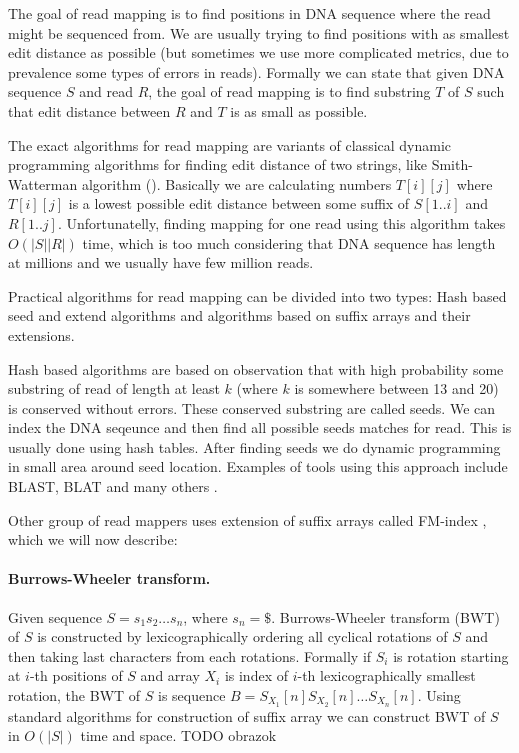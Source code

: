 The goal of read mapping is to find positions in DNA sequence where the read might be sequenced
from. We are usually trying to find positions with as smallest edit distance as possible
(but sometimes we use more complicated metrics, due to prevalence some types of errors in reads).
Formally we can state that given DNA sequence $S$ and read $R$, the goal of read mapping
is to find substring $T$ of $S$ such that edit distance between $R$ and $T$ is as small as possible.

The exact algorithms for read mapping are variants of classical dynamic programming algorithms
for finding edit distance of two strings, like Smith-Watterman algorithm (\cite{sm}).
Basically we are calculating numbers $T[i][j]$ where $T[i][j]$ is a lowest possible edit
distance between some suffix of $S[1..i]$ and $R[1..j]$. 
Unfortunatelly, finding mapping for one read using this algorithm takes $O(|S||R|)$ time,
which is too much considering that DNA sequence has length at millions and we usually have
few million reads.

Practical algorithms for read mapping can be divided into two types:
Hash based seed and extend algorithms and algorithms based on suffix arrays and their extensions.

Hash based algorithms are based on observation that with high
probability some substring of read of length at least $k$ (where $k$ is somewhere
between 13 and 20) is conserved without errors. These conserved substring
are called seeds. 
We can index the DNA seqeunce and then find all possible seeds matches for read.
This is usually done using hash tables. After finding seeds we do
dynamic programming in small area around seed location.
Examples of tools using this approach 
include BLAST, BLAT and many others \citep{blast,blat}.

Other group of read mappers uses extension of suffix arrays called FM-index
\citep{fmindex, fmindex2}, which we will now describe:

\paragraph{Burrows-Wheeler transform.} Given sequence $S = s_1 s_2 \dots s_n$, where
$s_n = \$$. Burrows-Wheeler transform (BWT) of $S$ is constructed
by lexicographically ordering all cyclical rotations of $S$ and then
taking last characters from each rotations.
Formally if $S_i$ is rotation starting at $i$-th positions of $S$ and array
$X_i$ is index of $i$-th lexicographically smallest rotation, the
BWT of $S$ is sequence $B = S_{X_1}[n] S_{X_2}[n] \dots S_{X_n}[n]$.
Using standard algorithms for construction of suffix array we
can construct BWT of $S$ in $O(|S|)$ time and space.
TODO obrazok

